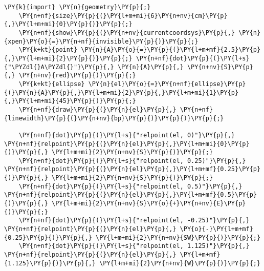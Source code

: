 \begin{Verbatim}[commandchars=\\\{\}]
    \PY{k}{import} \PY{n}{geometry}\PY{p}{;}
    \PY{n+nf}{size}\PY{p}{(}\PY{l+m+mi}{6}\PY{n+nv}{cm}\PY{p}{,}\PY{l+m+mi}{0}\PY{p}{)}\PY{p}{;}
    \PY{n+nf}{show}\PY{p}{(}\PY{n+nv}{currentcoordsys}\PY{p}{,} \PY{n}{xpen}\PY{o}{=}\PY{n+nf}{invisible}\PY{p}{)}\PY{p}{;}
    \PY{k+kt}{point} \PY{n}{A}\PY{o}{=}\PY{p}{(}\PY{l+m+mf}{2.5}\PY{p}{,}\PY{l+m+mi}{2}\PY{p}{)}\PY{p}{;} \PY{n+nf}{dot}\PY{p}{(}\PY{l+s}{"\PYZdl{}A\PYZdl{}"}\PY{p}{,} \PY{n}{A}\PY{p}{,} \PY{n+nv}{S}\PY{p}{,} \PY{n+nv}{red}\PY{p}{)}\PY{p}{;}
    \PY{k+kt}{ellipse} \PY{n}{el}\PY{o}{=}\PY{n+nf}{ellipse}\PY{p}{(}\PY{n}{A}\PY{p}{,}\PY{l+m+mi}{2}\PY{p}{,}\PY{l+m+mi}{1}\PY{p}{,}\PY{l+m+mi}{45}\PY{p}{)}\PY{p}{;}
    \PY{n+nf}{draw}\PY{p}{(}\PY{n}{el}\PY{p}{,} \PY{n+nf}{linewidth}\PY{p}{(}\PY{n+nv}{bp}\PY{p}{)}\PY{p}{)}\PY{p}{;}

    \PY{n+nf}{dot}\PY{p}{(}\PY{l+s}{"relpoint(el, 0)"}\PY{p}{,} \PY{n+nf}{relpoint}\PY{p}{(}\PY{n}{el}\PY{p}{,}\PY{l+m+mi}{0}\PY{p}{)}\PY{p}{,} \PY{l+m+mi}{2}\PY{n+nv}{S}\PY{p}{)}\PY{p}{;}
    \PY{n+nf}{dot}\PY{p}{(}\PY{l+s}{"relpoint(el, 0.25)"}\PY{p}{,} \PY{n+nf}{relpoint}\PY{p}{(}\PY{n}{el}\PY{p}{,}\PY{l+m+mf}{0.25}\PY{p}{)}\PY{p}{,} \PY{l+m+mi}{2}\PY{n+nv}{S}\PY{p}{)}\PY{p}{;}
    \PY{n+nf}{dot}\PY{p}{(}\PY{l+s}{"relpoint(el, 0.5)"}\PY{p}{,} \PY{n+nf}{relpoint}\PY{p}{(}\PY{n}{el}\PY{p}{,}\PY{l+m+mf}{0.5}\PY{p}{)}\PY{p}{,} \PY{l+m+mi}{2}\PY{n+nv}{S}\PY{o}{+}\PY{n+nv}{E}\PY{p}{)}\PY{p}{;}
    \PY{n+nf}{dot}\PY{p}{(}\PY{l+s}{"relpoint(el, -0.25)"}\PY{p}{,} \PY{n+nf}{relpoint}\PY{p}{(}\PY{n}{el}\PY{p}{,} \PY{o}{-}\PY{l+m+mf}{0.25}\PY{p}{)}\PY{p}{,} \PY{l+m+mi}{2}\PY{n+nv}{SW}\PY{p}{)}\PY{p}{;}
    \PY{n+nf}{dot}\PY{p}{(}\PY{l+s}{"relpoint(el, 1.125)"}\PY{p}{,} \PY{n+nf}{relpoint}\PY{p}{(}\PY{n}{el}\PY{p}{,} \PY{l+m+mf}{1.125}\PY{p}{)}\PY{p}{,} \PY{l+m+mi}{2}\PY{n+nv}{W}\PY{p}{)}\PY{p}{;}
\end{Verbatim}
